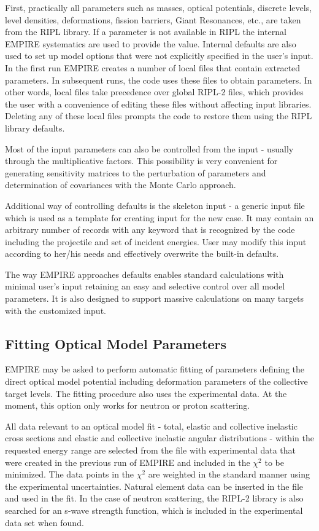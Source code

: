 \documentclass[twocolumn,amsmath,amssymb,10pt,groupedaddress,a4paper]{revtex4}
\begin{document}
First, practically all parameters such as masses, optical potentials, discrete levels, level densities, deformations, fission barriers, Giant Resonances, etc., are taken from the RIPL library. If a parameter is not available in RIPL the internal EMPIRE systematics are used to provide the value. Internal defaults are also used to set up model options that were not explicitly specified in the user's input. In the first run EMPIRE creates a number of local files that contain extracted parameters. In subsequent runs, the code uses these files to obtain parameters. In other words, local files take precedence over global RIPL-2 files, which provides the user with a convenience of editing these files without affecting input libraries. Deleting any of these local files prompts the code to restore them using the RIPL library defaults.

Most of the input parameters can also be controlled from the input - usually through the multiplicative factors. This possibility is very convenient for  generating sensitivity matrices to the perturbation of parameters and determination of covariances with the Monte Carlo approach.

Additional way of controlling defaults is the skeleton input - a generic input file which is used as a template for creating input for the new case. It may contain an arbitrary number of records with any keyword that is  recognized by the code including the projectile and set of incident energies. User may modify this input according to her/his needs and effectively overwrite the built-in defaults.

The way EMPIRE approaches defaults enables standard calculations with minimal user's input retaining an easy and selective control over all model parameters. It is also designed to support massive calculations on many targets with the customized input.

\subsection{Fitting Optical Model Parameters}
EMPIRE may be asked to perform automatic fitting of parameters defining the direct optical model potential including  deformation parameters of the collective target levels. The fitting procedure also uses the experimental data. At the moment, this option only works for neutron or proton scattering.

All data relevant to an optical model fit - total, elastic and collective inelastic cross sections and elastic and collective inelastic angular distributions - within the requested energy range are selected from the file with experimental data that were created in the previous run of EMPIRE and included in the $\chi^{2}$ to be minimized. The data points in the $\chi^{2}$ are weighted in the standard manner using the experimental uncertainties. Natural element data can be inserted in the file and used in the fit. In the case of neutron scattering, the RIPL-2 library is also searched for an s-wave strength function, which is included in the experimental data set when found.
\end{document}
